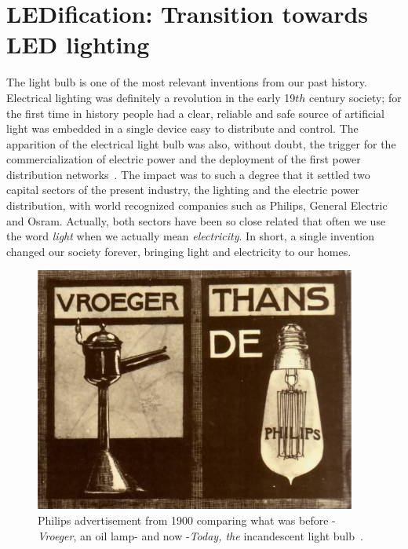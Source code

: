 \label{ch:twrd_HMLED}

\chapter[LEDification: Transition towards LED lighting]{LEDification: Transition towards LED lighting }


The light bulb is one of the most relevant inventions from our past history. Electrical lighting was definitely a revolution in the early 19${th}$ century society; for the first time in history people had a clear, reliable and safe source of artificial light was embedded in a single device easy to distribute and control. The apparition  of the electrical light bulb was also, without doubt, the trigger for the commercialization of electric power and the deployment of the first power distribution networks~\cite{14NYISO}. The impact was to such a degree that it settled two capital sectors of the present industry, the lighting and the electric power distribution, with  world recognized companies such as Philips, General Electric and Osram.  Actually, both sectors have been so close related that often we use the word \emph{light} when we actually mean \emph{electricity}. In short, a single invention changed our society forever, bringing light and electricity to our homes.

\begin{figure}[!h]
\centering
\includegraphics{./0_intro/img/1900-philips3.jpg}
\caption[Philips lights advertisement from 1900]{Philips advertisement from 1900 comparing what was before -\emph{Vroeger}, an oil lamp- and now -\emph{Today, the} incandescent light bulb~\cite{lib:Philips}.}
\label{fig:incandescent_light_blub}
\end{figure}

